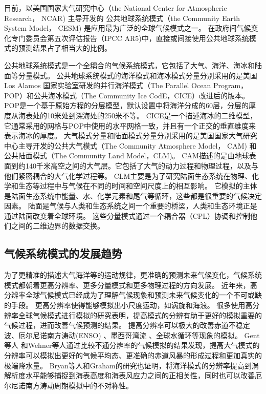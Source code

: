  
目前，以美国国家大气研究中心（the National Center for Atmospheric Research， NCAR) 主导开发的
公共地球系统模式（the Community Earth System Model， CESM) 是应用最为广泛的全球气候模式之一\cite{hurrell2013community}。
在政府间气候变化专门委员会第五次评估报告（IPCC AR5)中，直接或间接使用公共地球系统模式的预测结果占了相当大的比例\cite{stocker2013ipcc}。
 

公共地球系统模式是一个全耦合的气候系统模式，它包括了大气、海洋、海冰和陆面等分量模式。
公共地球系统模式的海洋模式和海冰模式分量分别采用的是美国Los Alamos 国家实验室研发的并行海洋模式（The Parallel Ocean Program，POP）和公共海冰模式（The Community Ice CodE，CICE）改进后的版本\cite{hurrell2013community}。
POP是一个基于原始方程的分层模型，默认设置中将海洋分成的60层，分层的厚度从海表处的10米处到深海处的250米不等。
CICE是一个描述海冰的二维模型，它通常采用的网格与POP中使用的水平网格一致，并且有一个正交的垂直维度来表示海冰的厚度。 
大气模式分量和陆面模式分量分别采用的是美国国家大气研究中心主导开发的公共大气模式（The Community Atmosphere Model， CAM) 和公共陆面模式（The Community Land Model，CLM)。 
CAM描述的是由地球表面到约140千米高空之间的大气层。它包括了大气的动力过程和物理过程，以及与他们紧密耦合的大气化学过程等。
CLM主要是为了研究陆面生态系统在物理、化学和生态等过程中与气候在不同的时间和空间尺度上的相互影响。
它模拟的主体是陆面生态系统中能量、水、化学元素和尾气等循环，这些都是很重要的气候决定因素。
陆面是气候与人类和生态系统之间一个重要的桥梁，人类和生态环境正是通过陆面改变着全球环境。
这些分量模式通过一个耦合器（CPL）协调和控制他们之间的二维边界的数据交换\cite{liu2014c}。

 

\subsection{气候系统模式的发展趋势}

为了更精准的描述大气海洋等的运动规律，更准确的预测未来气候变化，气候系统模式都朝着更高分辨率、更多分量模式和更多物理过程的方向发展\cite{stocker2013ipcc}。
近年来，高分辨率全球气候模式已经成为了理解气候现象和预测未来气候变化的一个不可或缺的手段。
更高分辨率使得能够模拟出小尺度运动，如涡旋和海浪。 
很多使用高分辨率全球气候模式进行模拟的研究表明，提高模式的分辨有助于更好的模拟重要的气候过程，进而改善气候预测的结果。
提高分辨率可以极大的改善赤道不稳定波\citep{roberts2009impact}、厄尔尼诺南方涛动(ENSO) \citep{shaffrey2009uk}、墨西哥湾流\citep{chassignet2008gulf, kuwano2010precipitation} 、全球水循环\citep{demory2014role}等现象的模拟。
Gent等人\cite{gent2010improvements} 和Wehner等人\cite{wehner2014effect}通过比较不通分辨率的气候模拟的结果发现，提高大气模式的分辨率可以模拟出更好的气候平均态、更准确的赤道风暴的形成过程和更加真实的极端降水量。
Bryan等人\cite{bryan2010frontal}和Graham\cite{graham2014importance}的研究也证明，将海洋模式的分辨率提高到涡解析度水平能够捕捉到海表高度和海表风应力之间的正相关性，同时也可以改善厄尔尼诺南方涛动周期模拟中的不对称性。



